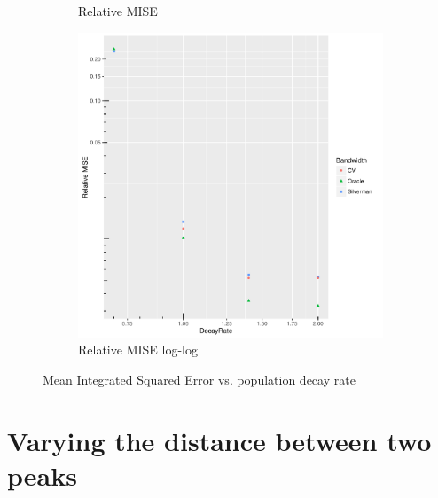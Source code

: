\begin{figure}[htbp]
\begin{subfigure}[b]{0.3\textwidth}
    \caption{Relative MISE}
    \end{subfigure}
    \begin{subfigure}[b]{0.3\textwidth}
    \includegraphics[width=\textwidth]{results/by_population_decay/RMISE-vs-population-decay-log-log}
    \caption{Relative MISE log-log}
    \end{subfigure}
    \caption[MISE: by risk decay]{Mean Integrated Squared Error vs. population decay rate}
    \label{fig:ise:pSD_100_1h}
\end{figure}


\section{Varying the distance between two peaks}
\label{sec:results:p1.4_100_G}

